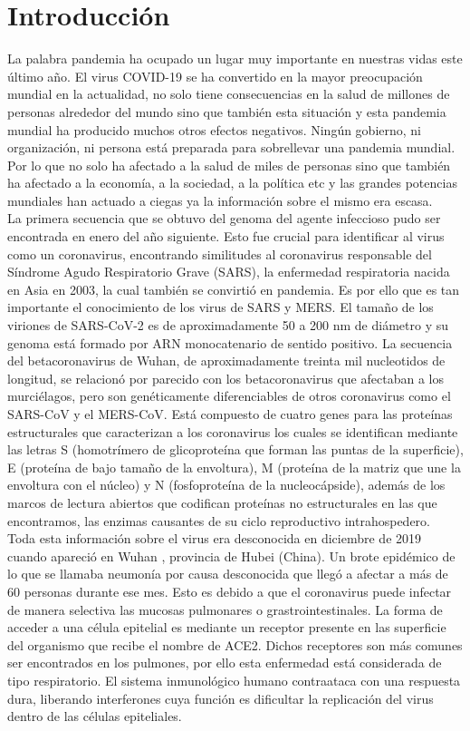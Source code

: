\section{Introducción}
		La palabra pandemia ha ocupado un lugar muy importante en nuestras vidas este último año. El virus COVID-19 se ha convertido en la mayor preocupación mundial en la actualidad, no solo tiene consecuencias en la salud de millones de personas alrededor del mundo sino que también esta situación y esta pandemia mundial ha producido muchos otros efectos negativos. Ningún gobierno, ni organización, ni persona está preparada para sobrellevar una pandemia mundial. Por lo que no solo ha afectado a la salud de miles de personas sino que también ha afectado a la economía, a la sociedad, a la política etc y las grandes potencias mundiales han actuado a ciegas ya la información sobre el mismo era escasa.\\
		
		\noindent La primera secuencia que se obtuvo del genoma del agente infeccioso pudo ser encontrada en enero del año siguiente. Esto fue crucial para identificar al virus como un coronavirus, encontrando similitudes al coronavirus responsable del Síndrome Agudo Respiratorio Grave (SARS), la enfermedad respiratoria nacida en Asia en 2003, la cual también se convirtió en pandemia. Es por ello que es tan importante el conocimiento de los virus de SARS y MERS. El tamaño de los viriones de SARS-CoV-2 es de aproximadamente 50 a 200 nm de diámetro y su genoma está formado por ARN monocatenario de sentido positivo. La secuencia del betacoronavirus de Wuhan, de aproximadamente treinta mil nucleotidos de longitud, se relacionó por parecido con los betacoronavirus que afectaban a los murciélagos, pero son genéticamente diferenciables de otros coronavirus como el SARS-CoV y el MERS-CoV.  Está compuesto de cuatro genes para las proteínas estructurales que caracterizan a los coronavirus los cuales se identifican mediante las letras S (homotrímero de glicoproteína que forman las puntas de la superficie), E (proteína de bajo tamaño de la envoltura), M (proteína de la matriz que une la envoltura con el núcleo) y N (fosfoproteína de la nucleocápside), además de los marcos de lectura abiertos que codifican proteínas no estructurales en las que encontramos, las enzimas causantes de su ciclo reproductivo intrahospedero. \\
		
		\noindent Toda esta información sobre el virus era desconocida en diciembre de 2019 cuando apareció en Wuhan , provincia de Hubei (China). Un brote epidémico de lo que se llamaba neumonía por causa desconocida que llegó a afectar a más de 60 personas durante ese mes. Esto es debido a que el coronavirus puede infectar de manera selectiva las mucosas pulmonares o grastrointestinales. La forma de acceder a una célula epitelial es mediante un receptor presente en las superficie del organismo que recibe el nombre de ACE2. Dichos receptores son más comunes ser encontrados en los pulmones, por ello esta enfermedad está considerada de tipo respiratorio. El sistema inmunológico humano contraataca con una respuesta dura, liberando interferones cuya función es dificultar la replicación del virus dentro de las células epiteliales.\\
		
